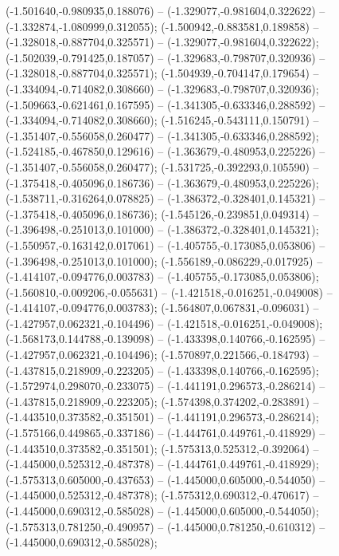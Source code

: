  (-1.501640,-0.980935,0.188076) -- (-1.329077,-0.981604,0.322622) -- (-1.332874,-1.080999,0.312055);
 (-1.500942,-0.883581,0.189858) -- (-1.328018,-0.887704,0.325571) -- (-1.329077,-0.981604,0.322622);
 (-1.502039,-0.791425,0.187057) -- (-1.329683,-0.798707,0.320936) -- (-1.328018,-0.887704,0.325571);
 (-1.504939,-0.704147,0.179654) -- (-1.334094,-0.714082,0.308660) -- (-1.329683,-0.798707,0.320936);
 (-1.509663,-0.621461,0.167595) -- (-1.341305,-0.633346,0.288592) -- (-1.334094,-0.714082,0.308660);
 (-1.516245,-0.543111,0.150791) -- (-1.351407,-0.556058,0.260477) -- (-1.341305,-0.633346,0.288592);
 (-1.524185,-0.467850,0.129616) -- (-1.363679,-0.480953,0.225226) -- (-1.351407,-0.556058,0.260477);
 (-1.531725,-0.392293,0.105590) -- (-1.375418,-0.405096,0.186736) -- (-1.363679,-0.480953,0.225226);
 (-1.538711,-0.316264,0.078825) -- (-1.386372,-0.328401,0.145321) -- (-1.375418,-0.405096,0.186736);
 (-1.545126,-0.239851,0.049314) -- (-1.396498,-0.251013,0.101000) -- (-1.386372,-0.328401,0.145321);
 (-1.550957,-0.163142,0.017061) -- (-1.405755,-0.173085,0.053806) -- (-1.396498,-0.251013,0.101000);
 (-1.556189,-0.086229,-0.017925) -- (-1.414107,-0.094776,0.003783) -- (-1.405755,-0.173085,0.053806);
 (-1.560810,-0.009206,-0.055631) -- (-1.421518,-0.016251,-0.049008) -- (-1.414107,-0.094776,0.003783);
 (-1.564807,0.067831,-0.096031) -- (-1.427957,0.062321,-0.104496) -- (-1.421518,-0.016251,-0.049008);
 (-1.568173,0.144788,-0.139098) -- (-1.433398,0.140766,-0.162595) -- (-1.427957,0.062321,-0.104496);
 (-1.570897,0.221566,-0.184793) -- (-1.437815,0.218909,-0.223205) -- (-1.433398,0.140766,-0.162595);
 (-1.572974,0.298070,-0.233075) -- (-1.441191,0.296573,-0.286214) -- (-1.437815,0.218909,-0.223205);
 (-1.574398,0.374202,-0.283891) -- (-1.443510,0.373582,-0.351501) -- (-1.441191,0.296573,-0.286214);
 (-1.575166,0.449865,-0.337186) -- (-1.444761,0.449761,-0.418929) -- (-1.443510,0.373582,-0.351501);
 (-1.575313,0.525312,-0.392064) -- (-1.445000,0.525312,-0.487378) -- (-1.444761,0.449761,-0.418929);
 (-1.575313,0.605000,-0.437653) -- (-1.445000,0.605000,-0.544050) -- (-1.445000,0.525312,-0.487378);
 (-1.575312,0.690312,-0.470617) -- (-1.445000,0.690312,-0.585028) -- (-1.445000,0.605000,-0.544050);
 (-1.575313,0.781250,-0.490957) -- (-1.445000,0.781250,-0.610312) -- (-1.445000,0.690312,-0.585028);
